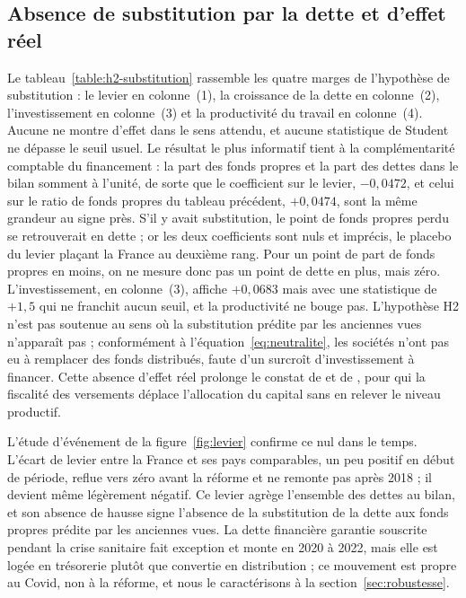 \subsection{Absence de substitution par la dette et d'effet réel}

Le tableau~\ref{table:h2-substitution} rassemble les quatre marges de l'hypothèse de substitution :
le levier en colonne~(1), la croissance de la dette en colonne~(2), l'investissement en colonne~(3)
et la productivité du travail en colonne~(4). Aucune ne montre d'effet dans le sens attendu, et
aucune statistique de Student ne dépasse le seuil usuel. Le résultat le plus informatif tient à la
complémentarité comptable du financement : la part des fonds propres et la part des dettes dans le
bilan somment à l'unité, de sorte que le coefficient sur le levier, $-0{,}0472$, et celui sur le
ratio de fonds propres du tableau précédent, $+0{,}0474$, sont la même grandeur au signe près. S'il
y avait substitution, le point de fonds propres perdu se retrouverait en dette ; or les deux
coefficients sont nuls et imprécis, le placebo du levier plaçant la France au deuxième rang. Pour un
point de part de fonds propres en moins, on ne mesure donc pas un point de dette en plus, mais zéro.
L'investissement, en colonne~(3), affiche $+0{,}0683$ mais avec une statistique de $+1{,}5$ qui ne
franchit aucun seuil, et la productivité ne bouge pas. L'hypothèse H2 n'est pas soutenue au sens où
la substitution prédite par les anciennes vues n'apparaît pas ; conformément à
l'équation~\eqref{eq:neutralite}, les sociétés n'ont pas eu à remplacer des fonds distribués, faute
d'un surcroît d'investissement à financer. Cette absence d'effet réel prolonge le constat de
\citet{alstadsater2017} et de \citet{becker2013}, pour qui la fiscalité des versements déplace
l'allocation du capital sans en relever le niveau productif.

L'étude d'événement de la figure~\ref{fig:levier} confirme ce nul dans le temps. L'écart de levier
entre la France et ses pays comparables, un peu positif en début de période, reflue vers zéro avant
la réforme et ne remonte pas après 2018 ; il devient même légèrement négatif. Ce levier agrège
l'ensemble des dettes au bilan, et son absence de hausse signe l'absence de la substitution de la
dette aux fonds propres prédite par les anciennes vues. La dette financière garantie souscrite
pendant la crise sanitaire fait exception et monte en 2020 à 2022, mais elle est logée en trésorerie
plutôt que convertie en distribution ; ce mouvement est propre au Covid, non à la réforme, et nous
le caractérisons à la section~\ref{sec:robustesse}.

